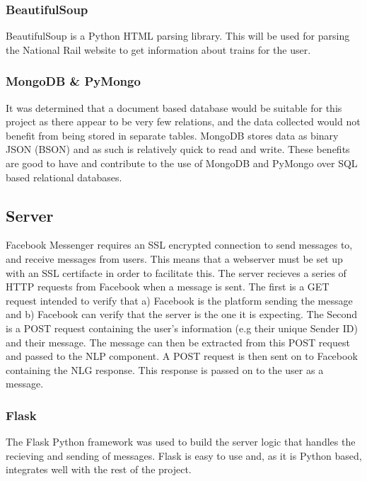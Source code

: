\documentclass[12pt,a4paper]{article}
\begin{document}
    \subsubsection*{BeautifulSoup}
    \label{subsubsection:BeautifulSoup}
    BeautifulSoup is a Python HTML parsing library. This will be used for parsing the National Rail website to get information about trains for the user.
    
    \subsubsection*{MongoDB \& PyMongo}
    \label{subsubsection:mongodb}
    It was determined that a document based database would be suitable for this project as there appear to be very few relations, and the data collected would not benefit from being stored in separate tables. MongoDB stores data as binary JSON (BSON) \citep{korneliusz_2014} and as such is relatively quick to read and write. These benefits are good to have and contribute to the use of MongoDB and PyMongo over SQL based relational databases.
    
    \subsection{Server}
    \label{subsection:Server}
    Facebook Messenger requires an SSL encrypted connection to send messages to, and receive messages from users. This means that a webserver must be set up with an SSL certifacte in order to facilitate this. The server recieves a series of HTTP requests from Facebook when a message is sent. The first is a GET request intended to verify that a) Facebook is the platform sending the message and b) Facebook can verify that the server is the one it is expecting. The Second is a POST request containing the user's information (e.g their unique Sender ID) and their message. The message can then be extracted from this POST request and passed to the NLP component. A POST request is then sent on to Facebook containing the NLG response. This response is passed on to the user as a message.
    
    \subsubsection*{Flask}
    The Flask Python framework was used to build the server logic that handles the recieving and sending of messages. Flask is easy to use and, as it is Python based, integrates well with the rest of the project.
    
\end{document}

